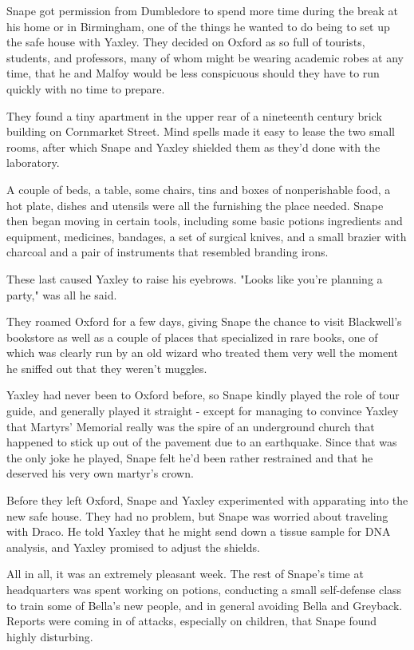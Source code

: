 \documentclass[a4paper,11pt]{article}
\begin{document}
Snape got permission from Dumbledore to spend more time during the break at his home or in Birmingham, one of the things he wanted to do being to set up the safe house with Yaxley. They decided on Oxford as so full of tourists, students, and professors, many of whom might be wearing academic robes at any time, that he and Malfoy would be less conspicuous should they have to run quickly with no time to prepare.

They found a tiny apartment in the upper rear of a nineteenth century brick building on Cornmarket Street. Mind spells made it easy to lease the two small rooms, after which Snape and Yaxley shielded them as they'd done with the laboratory.

A couple of beds, a table, some chairs, tins and boxes of nonperishable food, a hot plate, dishes and utensils were all the furnishing the place needed. Snape then began moving in certain tools, including some basic potions ingredients and equipment, medicines, bandages, a set of surgical knives, and a small brazier with charcoal and a pair of instruments that resembled branding irons.

These last caused Yaxley to raise his eyebrows. "Looks like you're planning a party," was all he said.

They roamed Oxford for a few days, giving Snape the chance to visit Blackwell's bookstore as well as a couple of places that specialized in rare books, one of which was clearly run by an old wizard who treated them very well the moment he sniffed out that they weren't muggles.

Yaxley had never been to Oxford before, so Snape kindly played the role of tour guide, and generally played it straight - except for managing to convince Yaxley that Martyrs' Memorial really was the spire of an underground church that happened to stick up out of the pavement due to an earthquake. Since that was the only joke he played, Snape felt he'd been rather restrained and that he deserved his very own martyr's crown.

Before they left Oxford, Snape and Yaxley experimented with apparating into the new safe house. They had no problem, but Snape was worried about traveling with Draco. He told Yaxley that he might send down a tissue sample for DNA analysis, and Yaxley promised to adjust the shields.

All in all, it was an extremely pleasant week. The rest of Snape's time at headquarters was spent working on potions, conducting a small self-defense class to train some of Bella's new people, and in general avoiding Bella and Greyback. Reports were coming in of attacks, especially on children, that Snape found highly disturbing.
\end{document}
